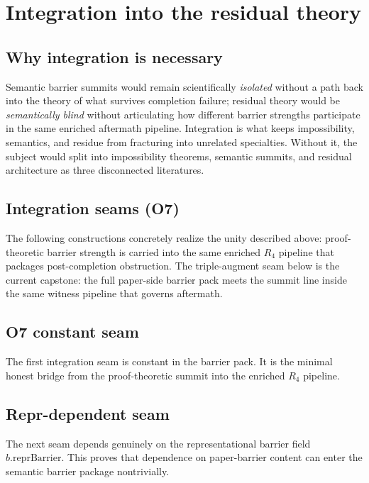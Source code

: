 \documentclass[11pt]{article}
\theoremstyle{plain}
\theoremstyle{definition}
\theoremstyle{remark}
\begin{document}
\section{Integration into the residual theory}

\subsection{Why integration is necessary}

Semantic barrier summits would remain scientifically \emph{isolated} without a path back into the theory of what survives completion failure; residual theory would be \emph{semantically blind} without articulating how different barrier strengths participate in the same enriched aftermath pipeline. Integration is what keeps impossibility, semantics, and residue from fracturing into unrelated specialties. Without it, the subject would split into impossibility theorems, semantic summits, and residual architecture as three disconnected literatures.

\subsection{Integration seams (O7)}

The following constructions concretely realize the unity described above: proof-theoretic barrier strength is carried into the same enriched \(R_4\) pipeline that packages post-completion obstruction. The triple-augment seam below is the current capstone: the full paper-side barrier pack meets the summit line inside the same witness pipeline that governs aftermath.

\subsection{O7 constant seam}

The first integration seam is constant in the barrier pack. It is the minimal honest bridge from the proof-theoretic summit into the enriched \(R_4\) pipeline.

\subsection{Repr-dependent seam}

The next seam depends genuinely on the representational barrier field \(b.\mathrm{reprBarrier}\). This proves that dependence on paper-barrier content can enter the semantic barrier package nontrivially.
\end{document}
